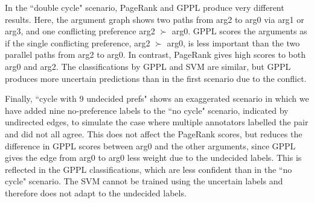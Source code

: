 In the ``double cycle" scenario, PageRank and GPPL produce very different results.
Here, the argument graph shows two paths from arg2 to arg0 via arg1 or arg3, and one conflicting
preference arg2 $\succ$ arg0. 
GPPL scores the arguments as if the single conflicting preference, arg2 $\succ$ arg0, 
is less important than the two parallel paths from arg2 to arg0. 
In contrast, PageRank gives high scores to both arg0 and arg2.
The classifications by GPPL and SVM are similar, but GPPL produces more uncertain 
predictions than in the first scenario due to the conflict.

Finally, ``cycle with 9 undecided prefs" shows an exaggerated scenario in which
we have added nine no-preference labels to the ``no cycle" scenario, indicated by 
undirected edges, to simulate the case where multiple annotators labelled the pair 
and did not all agree. 
This does not affect the PageRank scores, 
but reduces the difference in GPPL scores between arg0 and the other arguments, 
since GPPL gives the edge from arg0 to arg0 less weight due to the undecided labels. 
This is reflected in the GPPL classifications, which are less confident than in the ``no cycle" scenario.
The SVM cannot be trained using the uncertain labels and therefore does not adapt to the undecided labels. 

